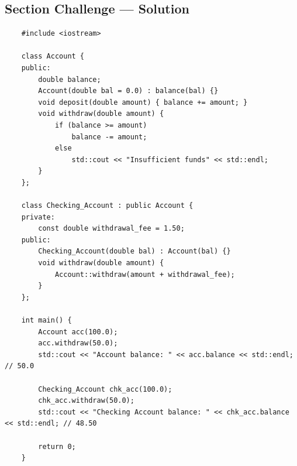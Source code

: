 \subsection{Section Challenge --- Solution}
\begin{lstlisting}
	#include <iostream>

	class Account {
	public:
		double balance;
		Account(double bal = 0.0) : balance(bal) {}
		void deposit(double amount) { balance += amount; }
		void withdraw(double amount) {
			if (balance >= amount)
				balance -= amount;
			else
				std::cout << "Insufficient funds" << std::endl;
		}
	};

	class Checking_Account : public Account {
	private:
		const double withdrawal_fee = 1.50;
	public:
		Checking_Account(double bal) : Account(bal) {}
		void withdraw(double amount) {
			Account::withdraw(amount + withdrawal_fee);
		}
	};

	int main() {
		Account acc(100.0);
		acc.withdraw(50.0);
		std::cout << "Account balance: " << acc.balance << std::endl; // 50.0

		Checking_Account chk_acc(100.0);
		chk_acc.withdraw(50.0);
		std::cout << "Checking Account balance: " << chk_acc.balance << std::endl; // 48.50

		return 0;
	}
\end{lstlisting}

